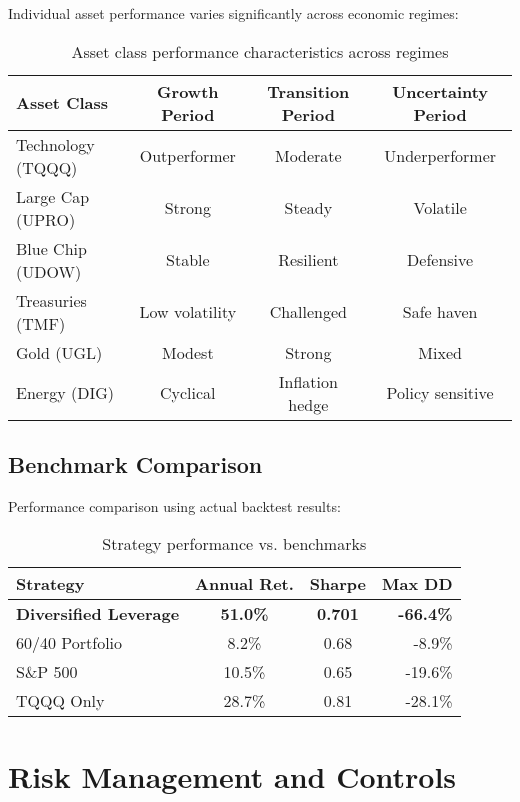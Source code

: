\documentclass[onecolumn,ieee]{arithmaxresearch}
\begin{document}
Individual asset performance varies significantly across economic regimes:

\begin{table}[h]
\centering
\begin{tabular}{lccc}
\toprule
\textbf{Asset Class} & \textbf{Growth Period} & \textbf{Transition Period} & \textbf{Uncertainty Period} \\
\midrule
Technology (TQQQ) & Outperformer & Moderate & Underperformer \\
Large Cap (UPRO) & Strong & Steady & Volatile \\
Blue Chip (UDOW) & Stable & Resilient & Defensive \\
Treasuries (TMF) & Low volatility & Challenged & Safe haven \\
Gold (UGL) & Modest & Strong & Mixed \\
Energy (DIG) & Cyclical & Inflation hedge & Policy sensitive \\
\bottomrule
\end{tabular}
\caption{Asset class performance characteristics across regimes}
\end{table}

\subsection{Benchmark Comparison}

Performance comparison using actual backtest results:

\begin{table}[h]
\centering
\begin{tabular}{lccr}
\toprule
Strategy & Annual Ret. & Sharpe & Max DD \\
\midrule
\textbf{Diversified Leverage} & \textbf{51.0\%} & \textbf{0.701} & \textbf{-66.4\%} \\
60/40 Portfolio & 8.2\% & 0.68 & -8.9\% \\
S\&P 500 & 10.5\% & 0.65 & -19.6\% \\
TQQQ Only & 28.7\% & 0.81 & -28.1\% \\
\bottomrule
\end{tabular}
\caption{Strategy performance vs. benchmarks}
\label{tab:performance}
\end{table}

\section{Risk Management and Controls}
\end{document}
